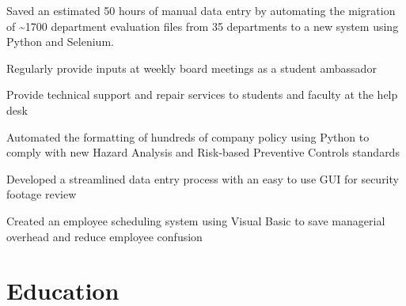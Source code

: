 \documentclass[]{deedy-resume-openfont}
\begin{document}
\begin{tightemize}
\item Saved an estimated 50 hours of manual data entry by automating the migration of \textasciitilde 1700 department evaluation files from 35 departments to a new system using Python and Selenium.
\item Regularly provide inputs at weekly board meetings as a student ambassador
\item Provide technical support and repair services to students and faculty at the help desk
\end{tightemize}
\sectionsep

\begin{tightemize}
\item Automated the formatting of hundreds of company policy using Python to comply with new Hazard Analysis and Risk-based Preventive Controls standards
\item Developed a streamlined data entry process with an easy to use GUI for security footage review
\item Created an employee scheduling system using Visual Basic to save managerial overhead and reduce employee confusion
\end{tightemize}
\sectionsep

\section{Education}
\sectionsep
\end{document}
